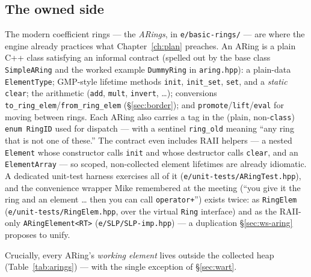 \documentclass[11pt,oneside]{report}
\newcommand{\code}[1]{\textcolor{m2code}{\texttt{#1}}}
\newcommand{\file}[1]{\textcolor{m2file}{\texttt{#1}}}
\begin{document}
\subsection{The owned side}

The modern coefficient rings --- the \emph{ARings}, in
\file{e/basic-rings/} --- are where the engine already practices what
Chapter~\ref{ch:plan} preaches. An ARing is a plain C++ class satisfying an
informal contract (spelled out by the base class \code{SimpleARing} and the
worked example \code{DummyRing} in \file{aring.hpp}): a plain-data
\code{ElementType}; GMP-style lifetime methods \code{init},
\code{init\_set}, \code{set}, and a \emph{static} \code{clear}; the
arithmetic (\code{add}, \code{mult}, \code{invert}, \ldots); conversions
\code{to\_ring\_elem}/\code{from\_ring\_elem} (\S\ref{sec:border}); and
\code{promote}/\code{lift}/\code{eval} for moving between rings. Each ARing
also carries a tag in the (plain, non-\code{class}) \code{enum RingID} used
for dispatch --- with a sentinel \code{ring\_old} meaning ``any ring that is
not one of these.'' The contract even includes RAII helpers --- a nested
\code{Element} whose constructor calls \code{init} and whose destructor
calls \code{clear}, and an \code{ElementArray} --- so scoped, non-collected
element lifetimes are already idiomatic. A dedicated unit-test harness
exercises all of it (\file{e/unit-tests/ARingTest.hpp}), and the convenience
wrapper Mike remembered at the meeting (``you give it the ring and an
element \ldots{} then you can call \code{operator+}'') exists twice: as
\code{RingElem} (\file{e/unit-tests/RingElem.hpp}, over the virtual
\code{Ring} interface) and as the RAII-only \code{ARingElement<RT>}
(\file{e/SLP/SLP-imp.hpp}) --- a duplication \S\ref{sec:ws-aring} proposes
to unify.

Crucially, every ARing's \emph{working element} lives outside the collected
heap (Table~\ref{tab:arings}) --- with the single exception of
\S\ref{sec:wart}.
\end{document}
